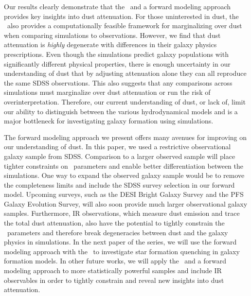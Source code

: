 Our results clearly demonstrate that the \eda~and a forward modeling approach
provides key insights into dust attenuation. For those uninterested in dust,
the \eda~also provides a computationally feasible framework for marginalizing
over dust when comparing simulations to observations. 
However, we find that dust attenuation is {\em highly} degenerate with
differences in their galaxy physics prescriptions.
Even though the simulations predict galaxy populations with significantly
different physical properties, there is enough uncertainty in our
understanding of dust that by adjusting attenuation alone they can all
reproduce the same SDSS observations.
This also suggests that any comparisons across simulations must marginalize
over dust attenuation or run the risk of overinterpretation. 
Therefore, our current understanding of dust, or lack of, limit our ability to
distinguish between the various hydrodynamical models and is a major bottleneck
for investigating galaxy formation using simulations.

The forward modeling approach we present offers many avenues for improving on
our understanding of dust. In this paper, we used a restrictive observational
galaxy sample from SDSS. Comparison to a larger observed sample will place
tighter constraints on \eda~parameters and enable better
differentiation between the simulations. One way to expand the observed galaxy
sample would be to remove the completeness limits and include the SDSS survey
selection in our forward model. Upcoming surveys, such as the DESI
Bright Galaxy Survey and the PFS Galaxy Evolution Survey, will also soon
provide much larger observational galaxy samples. Furthermore, IR observations,
which measure dust emission and trace the total dust attenuation, also have the
potential to tightly constrain the \eda~parameters and therefore break degeneracies
between dust and the galaxy physics in simulations. 
In the next paper of the series, we will use the forward modeling approach
with the \eda~to investigate star formation quenching in galaxy formation
models. 
In other future works, we will apply the \eda~and a forward modeling approach
to more statistically powerful samples and include IR observables in order to
tightly constrain and reveal new insights into dust attenuation. 
